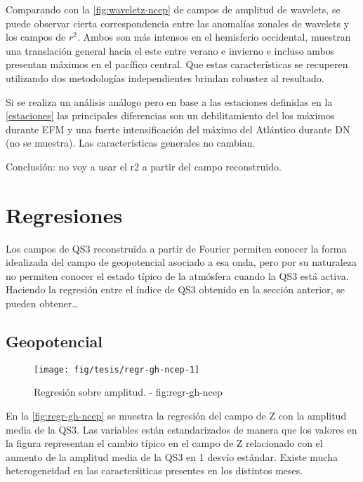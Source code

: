 \documentclass[spanish,a4paper,12p]{book}
\begin{document}
Comparando con la \autoref{fig:waveletz-ncep} de campos de amplitud de
wavelets, se puede observar cierta correspondencia entre las anomalías
zonales de wavelets y los campos de \(r^2\). Ambos son más intensos en
el hemisferio occidental, muestran una translación general hacia el este
entre verano e invierno e incluso ambos presentan máximos en el pacífico
central. Que estas características se recuperen utilizando dos
metodologías independientes brindan robustez al resultado.

Si se realiza un análisis análogo pero en base a las estaciones
definidas en la \autoref{estaciones} las principales diferencias son un
debilitamiento del los máximos durante EFM y una fuerte intensificación
del máximo del Atlántico durante DN (no se muestra). Las características
generales no cambian.

Conclusión: no voy a usar el r2 a partir del campo reconstruido.

\section{Regresiones}\label{regresiones}

Los campos de QS3 reconstruida a partir de Fourier permiten conocer la
forma idealizada del campo de geopotencial asociado a esa onda, pero por
su naturaleza no permiten conocer el estado típico de la atmósfera
cuando la QS3 está activa. Haciendo la regresión entre el índice de QS3
obtenido en la sección anterior, se pueden
obtener\ldots{}

\subsection{Geopotencial}\label{geopotencial}

\begin{landscape}\begin{figure}

{\centering \texttt{[image: fig/tesis/regr-gh-ncep-1]} 

}

\caption{Regresión sobre amplitud. - fig:regr-gh-ncep}\label{fig:regr-gh-ncep}
\end{figure}
\end{landscape}

En la \autoref{fig:regr-gh-ncep} se muestra la regresión del campo de Z
con la amplitud media de la QS3. Las variables están estandarizados de
manera que los valores en la figura representan el cambio típico en el
campo de Z relacionado con el aumento de la amplitud media de la QS3 en
1 desvío estándar. Existe mucha heterogeneidad en las caracterśiticas
presentes en los distintos meses.
\end{document}
